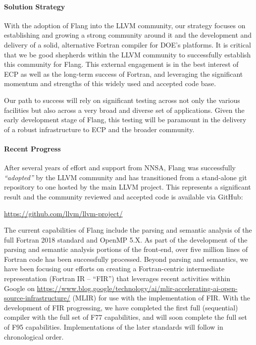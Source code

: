 \paragraph{Solution Strategy}

With the adoption of Flang into the LLVM community, our strategy
focuses on establishing and growing a strong community around it and the development
and delivery of a solid, alternative Fortran compiler for DOE's
platforms.  It is critical that we be good shepherds within
the LLVM community to successfully establish this community for Flang.
This external engagement is in the best interest
of ECP as well as the long-term success of Fortran, and leveraging
the significant momentum and strengths of this widely used and accepted
code base. 

Our path to success will rely on significant testing across not only
the various facilities but also across a very broad and diverse set of
applications. Given the early development stage of Flang, this testing
will be paramount in the delivery of a robust infrastructure to ECP
and the broader community.

\paragraph{Recent Progress}

After several years of effort and support from NNSA, Flang was 
successfully \emph{``adopted''} by the LLVM community and has transitioned 
from a stand-alone git repository to one hosted by the main LLVM project.  This 
represents a significant result and the community reviewed and accepted code is
available via GitHub:

\begin{center}
\url{https://github.com/llvm/llvm-project/}
\end{center}

The current capabilities of Flang include the parsing and semantic
analysis of the full Fortran 2018 standard and OpenMP 5.X. As part of the
development of the parsing and semantic analysis portions of the
front-end, over five million lines of Fortran code has been
successfully processed. Beyond parsing and semantics, we have been
focusing our efforts on creating a Fortran-centric intermediate
representation (Fortran IR -- ``FIR'') that leverages recent activities
within Google on 
\href{Multi-Level Intermediate Representations} 
{https://www.blog.google/technology/ai/mlir-accelerating-ai-open-source-infrastructure/}
(MLIR) for use with the implementation of FIR.
With the development of FIR progressing, we have completed
the first full (sequential) compiler with the full set of F77 
capabilities, and will soon complete the full set of F95 capabilities.
Implementations of the later standards will follow in chronological order.

